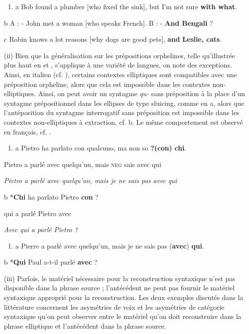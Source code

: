 \begin{enumerate}
\item \label{bkm:Ref305362907}a  Bob found a plumber [who fixed the sink], but I'm not sure \textbf{with what}. 


\end{enumerate}
  b  A : - John met a woman [who speaks French]. B : - \textbf{And Bengali} ?

  c  Robin knows a lot reasons [why dogs are good pets], \textbf{and} \textbf{Leslie, cats}.  

(ii) Bien que la généralisation sur les prépositions orphelines, telle qu'illustrée plus haut en  et , s'applique à une variété de langues, on note des exceptions. Ainsi, en italien (cf. \citet{Merchant2001}), certains contextes elliptiques sont compatibles avec une préposition orpheline, alors que cela est impossible dans les contextes non-elliptiques. Ainsi, on peut avoir un syntagme \textit{qu-} sans préposition à la place d'un syntagme prépositionnel dans les ellipses de type sluicing, comme en a, alors que l'antéposition du syntagme interrogatif sans préposition est impossible dans les contextes non-elliptiques à extraction, cf. b. Le même comportement est observé en français, cf. .


\begin{enumerate}
\item \label{bkm:Ref305960276}a  Pietro  ha  parlato  con  qualcuno,  ma  non  so  \textbf{?(con)  chi}.


\end{enumerate}
  Pietro  a  parlé  avec  quelqu'un,  mais  \textsc{neg}  sais  avec  qui

\textit{  Pietro a parlé avec quelqu'un, mais je ne sais pas avec qui}  

  b  *\textbf{Chi}  ha  parlato  Pietro  \textbf{con} ?

    qui  a  parlé  Pietro  avec

    \textit{Avec qui a parlé Pietro ?}


\begin{enumerate}
\item \label{bkm:Ref306366831}a  Pierre a parlé avec quelqu'un, mais je ne sais pas (\textbf{avec}) \textbf{qui}. 


\end{enumerate}
  b  *\textbf{Qui} Paul a-t-il parlé \textbf{avec} ? 

(iii) Parfois, le matériel nécessaire pour la reconstruction syntaxique n'est pas disponible dans la phrase source ; l'antécédent ne peut pas fournir le matériel syntaxique approprié pour la reconstruction. Les deux exemples discutés dans la littérature concernent les asymétries de voix et les asymétries de catégorie syntaxique qu'on peut observer entre le matériel qu'on doit reconstruire dans la phrase elliptique et l'antécédent dans la phrase source. 

